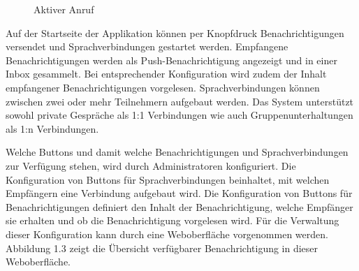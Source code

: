 \begin{figure}[h]
\begin{minipage}[b]{0.4\textwidth}
        \caption{Aktiver Anruf}
    \end{minipage}
    \label{fig:MobileClient-ScreensIntroduction}
\end{figure}

Auf der Startseite der Applikation können per Knopfdruck Benachrichtigungen versendet und Sprachverbindungen gestartet werden.
Empfangene Benachrichtigungen werden als Push-Benachrichtigung angezeigt und in einer Inbox gesammelt.
Bei entsprechender Konfiguration wird zudem der Inhalt empfangener Benachrichtigungen vorgelesen.
Sprachverbindungen können zwischen zwei oder mehr Teilnehmern aufgebaut werden.
Das System unterstützt sowohl private Gespräche als 1:1 Verbindungen wie auch Gruppenunterhaltungen als 1:n Verbindungen.

Welche Buttons und damit welche Benachrichtigungen und Sprachverbindungen zur Verfügung stehen, wird durch Administratoren konfiguriert.
Die Konfiguration von Buttons für Sprachverbindungen beinhaltet, mit welchen Empfängern eine Verbindung aufgebaut wird.
Die Konfiguration von Buttons für Benachrichtigungen definiert den Inhalt der Benachrichtigung, welche Empfänger sie erhalten und ob die Benachrichtigung vorgelesen wird.
Für die Verwaltung dieser Konfiguration kann durch eine Weboberfläche vorgenommen werden.
Abbildung 1.3 zeigt die Übersicht verfügbarer Benachrichtigung in dieser Weboberfläche.

